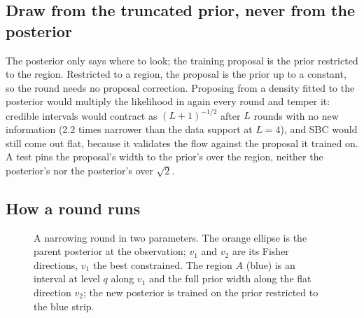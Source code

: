 \documentclass[10pt,a4paper]{article}
\begin{document}
\subsection{Draw from the truncated prior, never from the posterior}

The posterior only says where to look; the training proposal is the prior restricted to the region. Restricted to a region,
the proposal is the prior up to a constant, so the round needs no proposal correction. Proposing from a density fitted
to the posterior would multiply the likelihood in again every round and temper it: credible intervals would contract as
$(L+1)^{-1/2}$ after $L$ rounds with no new information (2.2 times narrower than the data support at $L=4$), and SBC would
still come out flat, because it validates the flow against the proposal it trained on. A test pins the proposal's width
to the prior's over the region, neither the posterior's nor the posterior's over $\sqrt2$.

\subsection{How a round runs}

\begin{figure}[ht]
\centering
{}
\caption{A narrowing round in two parameters. The orange ellipse is the parent posterior at the observation; $v_1$ and $v_2$
are its Fisher directions, $v_1$ the best constrained. The region $A$ (blue) is an interval at level $q$ along $v_1$ and the
full prior width along the flat direction $v_2$; the new posterior is trained on the prior restricted to the blue strip.}
\label{fig:tsnpe}
\end{figure}
\end{document}
